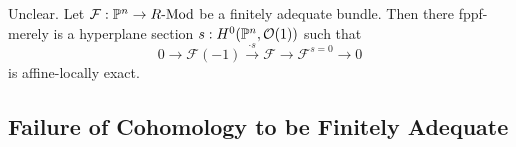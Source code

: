 \begin{corollary}
  {\color{red} Unclear.}
  Let $\mathcal F : \mathbb{P}^n \to R\text{-}\mathrm{Mod}$ be a finitely adequate bundle.
  Then there fppf-merely is a hyperplane section $s : H^0(\mathbb{P}^n,\mathcal O(1))$ such that
  \[
    0 \to \mathcal F(-1) \overset{\cdot s}{\to} \mathcal F \to \mathcal F^{s=0}\to 0
  \]
  is affine-locally exact.
\end{corollary}





\subsection{Failure of Cohomology to be Finitely Adequate}
  \label{example-non-f-aq-cohomology}

